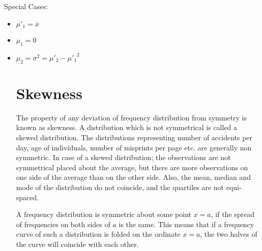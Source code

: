 \documentclass[
10pt, %
a4paper, %
]{report}
\begin{document}
Special Cases:
\begin{itemize}
\item \(\mu'_1 = \overline{x}\)
\item \(\mu_1 = 0\)
\item \(\mu_2 = \sigma^2 = \mu'_2 - {\mu'_1}^2\)

\section{Skewness}

The property of any deviation of frequency distribution from symmetry is known as skewness. A distribution which is not symmetrical is called a skewed distribution. The distributions representing number of accidents per day, age of individuals, number of misprints per page etc. are generally non symmetric. In case of a skewed distribution; the observations are not symmetrical placed about the average, but there are more observations on one side of the average than on the other side. Also, the mean, median and mode of the distribution do not coincide, and the quartiles are not equi-spaced.

A frequency distribution is symmetric about some point \(x=a\), if the spread of frequencies on both sides of \(a\) is the same. This means that if a frequency curve of such a distribution is folded on the ordinate \(x = a\), the two halves of the curve will coincide with each other.


\end{itemize}
\end{document}
